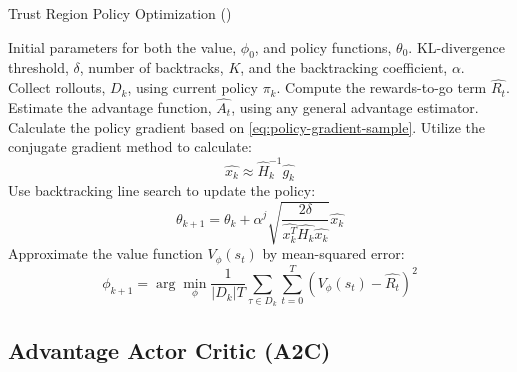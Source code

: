 \begin{algorithm}[htbp]
\caption{Trust Region Policy Optimization (\cite{schulman2017trust})} 
\label{alg:TRPO}

\begin{algorithmic}[1]
\State {} Initial parameters for both the value, $\phi_0$, and policy functions, $\theta_0$.
\State {} KL-divergence threshold, $\delta$, number of backtracks, $K$, and the backtracking coefficient, $\alpha$.
    \State Collect rollouts, $D_k$, using current policy $\pi_k$.
    \State Compute the rewards-to-go term $\hat{R_t}$. 
    \State Estimate the advantage function, $\hat{A_t}$, using any general advantage estimator.
    \State Calculate the policy gradient based on \textcolor{deepblue}{\autoref{eq:policy-gradient-sample}}.
    \State Utilize the conjugate gradient method to calculate:
    \begin{equation*}
    \hat{x_k} \approx \hat{H}^{-1}_{k} \hat{g_k}
    \end{equation*}
    \State Use backtracking line search to update the policy:
    \begin{equation*}
    \theta_{k+1} = \theta_k + \alpha^j \sqrt{\frac{2\delta}{\hat{x_k^T} \hat{H_k} \hat{x_k}}} \hat{x_k} 
    \end{equation*}
    \State Approximate the value function $V_{\phi}(s_t)$ by mean-squared error:
    \begin{equation*}
    \phi_{k+1} = \arg \min_{\phi} \frac{1}{|D_k| T} \sum_{\tau \in D_k} \sum_{t=0}^{T} \left( V_\phi(s_t) - \hat{R_t} \right)^2
    \end{equation*}
\EndFor
\end{algorithmic}
\end{algorithm}


\subsection{Advantage Actor Critic (A2C)}
\label{sec:a2c}

